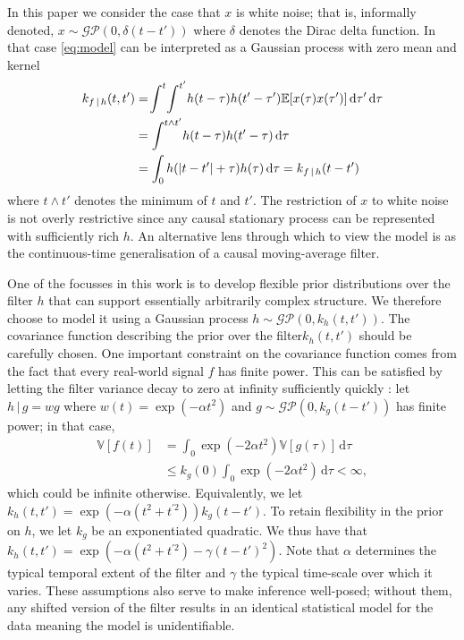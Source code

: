 \documentclass{article}
\newcommand{\id}[1]{\, \mathrm{d} #1}     %
\newcommand{\cond}{\, | \,}               %
\begin{document}
In this paper we consider the case that $x$ is white noise; that is, informally denoted, $x \sim \mathcal{GP}(0,\delta(t-t'))$ where $\delta$ denotes the Dirac delta function. In that case \cref{eq:model} can be interpreted as a Gaussian process with zero mean and kernel
\begin{align}
    k_{f\cond h}(t,t')&= \!\int^t \! \int^{t'}\!h(t- \tau) \vspace{-1mm} h(t'- \tau')
        \mathbb{E}[ x(\tau) x(\tau')]\id{\tau'} \id{\tau} \nonumber \\
    &= \int^{t \land t'} \! h(t - \tau) h(t' - \tau) \id{\tau} \nonumber \\
    &= \int_0 h(|t - t'| + \tau)h(\tau) \id{\tau} = k_{f\cond h}(t-t')  \label{eq:kernel} 
\end{align}
where $t \land t'$ denotes the minimum of $t$ and $t'$. The restriction of $x$ to white noise is not overly restrictive since any causal stationary process can be represented with sufficiently rich $h$. An alternative lens through which to view the model is as the continuous-time generalisation of a causal moving-average filter.

One of the focusses in this work is to develop flexible prior distributions over the filter $h$ that can support essentially arbitrarily complex structure. We therefore choose to model it using a Gaussian process $h \sim \mathcal{GP}(0,k_h(t,t'))$. The covariance function describing the prior over the filter$k_h(t,t')$ should be carefully chosen. One important constraint on the covariance function comes from the fact that every real-world signal $f$ has finite power. This can be satisfied by letting the filter variance decay to zero at infinity sufficiently quickly \citet{Tobar:2015:Learning_Stationary}: let $h\cond g = w g$ where $w(t)= \exp(- \alpha t^2)$ and $g \sim \mathcal{GP}(0,k_g(t-t'))$ has finite power; in that case, %
\begin{align*}
    \mathbb{V}[f(t)]
    &= \int_{0}\exp(-2 \alpha t^2)\mathbb{V}[g(\tau)]\id{\tau} \\
    &\le k_g(0) \int_0 \exp(- 2 \alpha t^2) \id{\tau} < \infty,
\end{align*}
which could be infinite otherwise.
Equivalently, we let $k_h(t,t')=\exp(- \alpha (t^2 + t^{\prime 2}))k_g(t-t')$. To retain flexibility in the prior on $h$, we let $k_g$ be an exponentiated quadratic. We thus have that $k_h(t,t')=\exp(- \alpha (t^2 + t^{\prime 2}) - \gamma(t-t')^2)$. Note that $\alpha$ determines the typical temporal extent of the filter and $\gamma$ the typical time-scale over which it varies. These assumptions also serve to make inference well-posed; without them, any shifted version of the filter results in an identical statistical model for the data meaning the model is unidentifiable.
\end{document}
